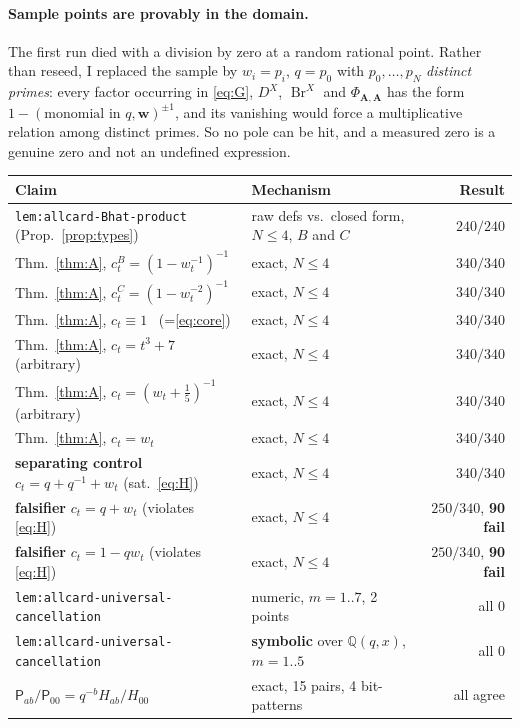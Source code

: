 \documentclass[11pt]{article}
\theoremstyle{plain}
\theoremstyle{definition}
\theoremstyle{remark}
\newcommand{\bA}{\mathbf A}
\newcommand{\bw}{\mathbf w}
\newcommand{\Br}{\operatorname{Br}}
\begin{document}
\paragraph{Sample points are provably in the domain.}
The first run died with a division by zero at a random rational point. Rather than
reseed, I replaced the sample by $w_i=p_i$, $q=p_0$ with $p_0,\dots,p_N$
\emph{distinct primes}: every factor occurring in
\eqref{eq:G}, $D^X$, $\Br^X$ and $\Phi_{\bA,\bA}$ has the form $1-(\text{monomial
in }q,\bw)^{\pm1}$, and its vanishing would force a multiplicative relation among
distinct primes. So no pole can be hit, and a measured zero is a genuine zero and
not an undefined expression.

\begin{center}
\small
\begin{tabular}{llr}
\hline
Claim & Mechanism & Result\\
\hline
\texttt{lem:allcard-Bhat-product} (Prop.~\ref{prop:types})
 & raw defs vs.\ closed form, $N\le4$, $B$ and $C$ & $240/240$\\
Thm.~\ref{thm:A}, $c^B_t=(1-w_t^{-1})^{-1}$ & exact, $N\le4$ & $340/340$\\
Thm.~\ref{thm:A}, $c^C_t=(1-w_t^{-2})^{-1}$ & exact, $N\le4$ & $340/340$\\
Thm.~\ref{thm:A}, $c_t\equiv1$ \ (\;=\;\eqref{eq:core}) & exact, $N\le4$ & $340/340$\\
Thm.~\ref{thm:A}, $c_t=t^3+7$ (arbitrary) & exact, $N\le4$ & $340/340$\\
Thm.~\ref{thm:A}, $c_t=(w_t+\tfrac15)^{-1}$ (arbitrary) & exact, $N\le4$ & $340/340$\\
Thm.~\ref{thm:A}, $c_t=w_t$ & exact, $N\le4$ & $340/340$\\
\textbf{separating control} $c_t=q+q^{-1}+w_t$ (sat.\ \eqref{eq:H}) & exact, $N\le4$ & $340/340$\\
\textbf{falsifier} $c_t=q+w_t$ (violates \eqref{eq:H}) & exact, $N\le4$ & $250/340$, \textbf{90 fail}\\
\textbf{falsifier} $c_t=1-qw_t$ (violates \eqref{eq:H}) & exact, $N\le4$ & $250/340$, \textbf{90 fail}\\
\texttt{lem:allcard-universal-cancellation} & numeric, $m=1..7$, 2 points & all $0$\\
\texttt{lem:allcard-universal-cancellation} & \textbf{symbolic} over $\mathbb Q(q,x)$, $m=1..5$ & all $0$\\
$\mathsf P_{ab}/\mathsf P_{00}=q^{-b}H_{ab}/H_{00}$ & exact, 15 pairs, 4 bit-patterns & all agree\\
\hline
\end{tabular}
\end{center}
\end{document}

